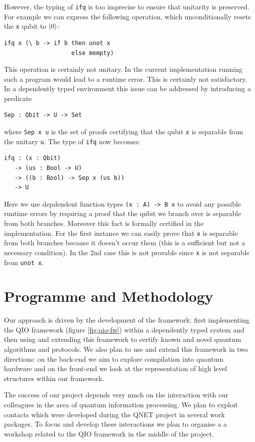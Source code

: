 \documentclass[a4paper]{article}
\begin{document}
However, the typing of \texttt{ifq} is too imprecise to ensure that
unitarity is preserved. For example we can express the following
operation, which unconditionally resets the \texttt{x} qubit to $\mathinner{|{0}\rangle}$:
\begin{verbatim}
ifq x (\ b -> if b then unot x 
                   else mempty)  
\end{verbatim}
This operation is certainly not unitary. In the current implementation
running such a program would lead to a runtime error. This is
certainly not 
satisfactory. In a dependently typed environment this issue can be
addressed by introducing a predicate
\begin{verbatim}
Sep : Qbit -> U -> Set
\end{verbatim}
where \verb+Sep x u+ is the set of proofs certifying that the qubit \texttt{x} is separable
from the unitary \texttt{u}. The type of \texttt{ifq} now becomes:
\begin{verbatim}
ifq : (x : Qbit) 
   -> (us : Bool -> U) 
   -> ((b : Bool) -> Sep x (us b)) 
   -> U  
\end{verbatim}
Here we use depdendent function types \verb+(x : A) -> B x+ to 
avoid any possible runtime errors by requiring a proof
that the qubit we branch over is separable from both
branches. Moreover this fact is formally certified in the
implementation. For the first instance we can easily prove that
\texttt{x} is separable from both branches because it doesn't occur
them (this is a sufficient but not a necessary condition). In the 2nd
case this is not provable since \texttt{x} is not separable from
\verb+unot x+.

\section{Programme and Methodology}

Our approach is driven by the development of the framework: first
implementing the QIO framework (figure \ref{fig:qio-fw}) within a dependently typed system and
then using and extending this framework to certify known and novel
quantum algorithms and protocols. We also plan to use and extend this
framework in two directions: on the back-end we aim to explore compilation
into quantum hardware and on the front-end we look at the
representation of high level structures within our framework.

The success of our project depends very much on the interaction with
our colleagues in the area of quantum information processing. We plan
to exploit contacts which were developed during the QNET project in
several work packages. To focus and develop these interactions we plan
to organise a a workshop related to the QIO framework in the middle of
the project.
\end{document}
